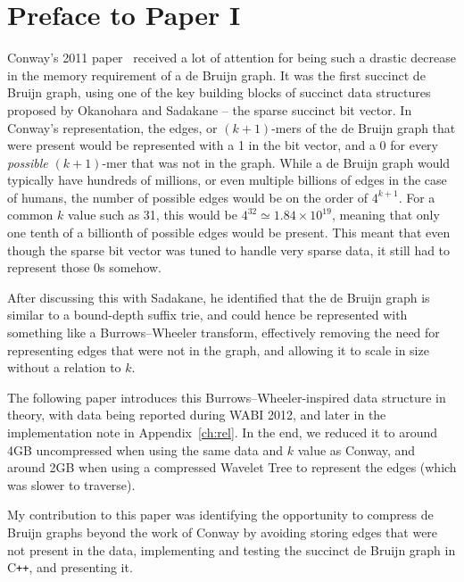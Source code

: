\chapter*{Preface to Paper I}

Conway's 2011 paper~\cite{conway} received a lot of attention for being such a drastic decrease in the memory requirement of a de Bruijn graph. It was the first succinct de Bruijn graph, using one of the key building blocks of succinct data structures proposed by Okanohara and Sadakane \cite{bitvector} -- the sparse succinct bit vector. In Conway's representation, the edges, or $(k+1)$-mers of the de Bruijn graph that were present would be represented with a 1 in the bit vector, and a 0 for every \emph{possible} $(k+1)$-mer that was not in the graph.
While a de Bruijn graph would typically have hundreds of millions, or even multiple billions of edges in the case of humans, the number of possible edges would be on the order of $4^{k+1}$. For a common $k$ value such as 31, this would be $4^{32} \simeq 1.84 \times 10^{19}$, meaning that only one tenth of a billionth of possible edges would be present. This meant that even though the sparse bit vector was tuned to handle very sparse data, it still had to represent those 0s somehow.

After discussing this with Sadakane, he identified that the de Bruijn graph is similar to a bound-depth suffix trie, and could hence be represented with something like a Burrows--Wheeler transform, effectively removing the need for representing edges that were not in the graph, and allowing it to scale in size without a relation to $k$.

The following paper introduces this Burrows--Wheeler-inspired data structure in theory, with data being reported during WABI 2012, and later in the implementation note in Appendix~\ref{ch:rel}. In the end, we reduced it to around 4GB uncompressed when using the same data and $k$ value as Conway, and around 2GB when using a compressed Wavelet Tree to represent the edges (which was slower to traverse).

My contribution to this paper was identifying the opportunity to compress de Bruijn graphs beyond the work of Conway by avoiding storing edges that were not present in the data, implementing and testing the succinct de Bruijn graph in C\texttt{++}, and presenting it.

